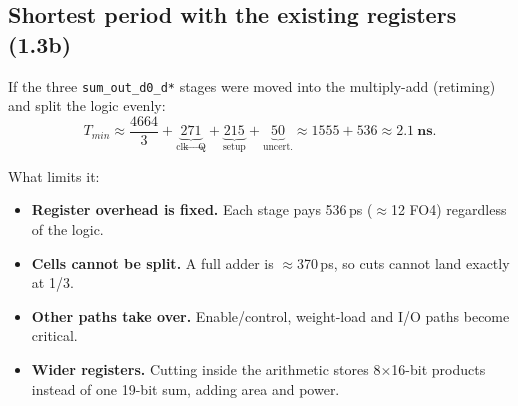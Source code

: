 \subsection{Shortest period with the existing registers (1.3b)}

If the three \texttt{sum\_out\_d0\_d*} stages were moved into the multiply-add (retiming) and split
the logic evenly:
\[
T_{min} \approx \frac{4664}{3} + \underbrace{271}_{\text{clk}\rightarrow\text{Q}} + \underbrace{215}_{\text{setup}} + \underbrace{50}_{\text{uncert.}}
\approx 1555 + 536 \approx \mathbf{2.1\ ns}.
\]

What limits it:
\begin{itemize}
  \item \textbf{Register overhead is fixed.} Each stage pays 536\,ps ($\approx$12 FO4) regardless of the logic.
  \item \textbf{Cells cannot be split.} A full adder is $\approx$370\,ps, so cuts cannot land exactly at 1/3.
  \item \textbf{Other paths take over.} Enable/control, weight-load and I/O paths become critical.
  \item \textbf{Wider registers.} Cutting inside the arithmetic stores 8$\times$16-bit products instead of one
        19-bit sum, adding area and power.
\end{itemize}
